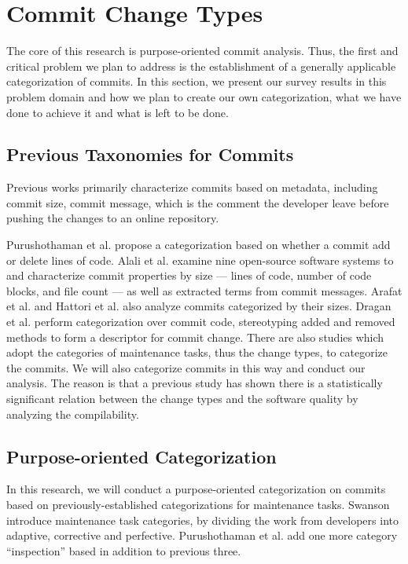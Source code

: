 \section{Commit Change Types}
\label{sec:type}

The core of this research is purpose-oriented commit analysis. Thus, the first and critical problem we plan to address is the establishment of a generally applicable categorization of commits. 
In this section, we present our survey results in this problem domain and how we plan to create our own categorization, what we have done to achieve it and what is left to be done.

\subsection{Previous Taxonomies for Commits}
Previous works primarily characterize commits based on metadata, including commit size, commit message, which is the comment the developer leave before pushing the changes to an online repository. 

Purushothaman et al. \cite{purushothaman2004towards} propose a categorization based on whether a commit add or delete lines of code.
Alali et al.\cite{alali_2008} examine nine open-source software systems to and characterize commit properties by size --- lines of code, number of code blocks, and file count --- as well as extracted terms from commit messages.
Arafat et al. \cite{arafat2009commit} and Hattori et al. \cite{hattori2008nature} also analyze commits categorized by their sizes. 
Dragan et al. \cite{Dragan} perform categorization over commit code, stereotyping added and removed methods to form a descriptor for commit change.
There are also studies which adopt the categories of maintenance tasks, thus the change types, to categorize the commits. 
We will also categorize commits in this way and conduct our analysis.
The reason is that a previous study \cite{qrs2020} has shown there is a statistically significant relation between the change types and the software quality by analyzing the compilability.

\subsection{Purpose-oriented Categorization}
In this research, we will conduct a purpose-oriented categorization on commits based on previously-established categorizations for maintenance tasks.
Swanson \cite{Swanson} introduce maintenance task categories, by dividing the work from developers into adaptive, corrective and perfective.
Purushothaman et al. \cite{purushothaman2004towards} add one more category ``inspection'' based in addition to previous three.

